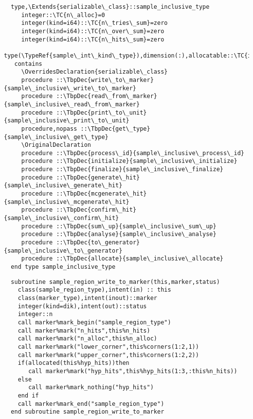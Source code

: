 \begin{Verbatim}
  type,\Extends{serializable\_class}::sample_inclusive_type
     integer::\TC{n\_alloc}=0
     integer(kind=i64)::\TC{n\_tries\_sum}=zero
     integer(kind=i64)::\TC{n\_over\_sum}=zero
     integer(kind=i64)::\TC{n\_hits\_sum}=zero
     type(\TypeRef{sample\_int\_kind\_type}),dimension(:),allocatable::\TC{int\_kinds}
   contains
     \OverridesDeclaration{serializable\_class}
     procedure ::\TbpDec{write\_to\_marker}{sample\_inclusive\_write\_to\_marker}
     procedure ::\TbpDec{read\_from\_marker}{sample\_inclusive\_read\_from\_marker}
     procedure ::\TbpDec{print\_to\_unit}{sample\_inclusive\_print\_to\_unit}
     procedure,nopass ::\TbpDec{get\_type}{sample\_inclusive\_get\_type}
     \OriginalDeclaration
     procedure ::\TbpDec{process\_id}{sample\_inclusive\_process\_id}
     procedure ::\TbpDec{initialize}{sample\_inclusive\_initialize}
     procedure ::\TbpDec{finalize}{sample\_inclusive\_finalize}
     procedure ::\TbpDec{generate\_hit}{sample\_inclusive\_generate\_hit}
     procedure ::\TbpDec{mcgenerate\_hit}{sample\_inclusive\_mcgenerate\_hit}
     procedure ::\TbpDec{confirm\_hit}{sample\_inclusive\_confirm\_hit}
     procedure ::\TbpDec{sum\_up}{sample\_inclusive\_sum\_up}
     procedure ::\TbpDec{analyse}{sample\_inclusive\_analyse}
     procedure ::\TbpDec{to\_generator}{sample\_inclusive\_to\_generator}
     procedure ::\TbpDec{allocate}{sample\_inclusive\_allocate}
  end type sample_inclusive_type
\end{Verbatim}
\Methods
{}
\begin{Verbatim}
  subroutine sample_region_write_to_marker(this,marker,status)
    class(sample_region_type),intent(in) :: this
    class(marker_type),intent(inout)::marker
    integer(kind=dik),intent(out)::status
    integer::n
    call marker%mark_begin("sample_region_type")
    call marker%mark("n_hits",this%n_hits)
    call marker%mark("n_alloc",this%n_alloc)
    call marker%mark("lower_corner",this%corners(1:2,1))
    call marker%mark("upper_corner",this%corners(1:2,2))
    if(allocated(this%hyp_hits))then
       call marker%mark("hyp_hits",this%hyp_hits(1:3,:this%n_hits))
    else
       call marker%mark_nothing("hyp_hits")
    end if
    call marker%mark_end("sample_region_type")
  end subroutine sample_region_write_to_marker
\end{Verbatim}

